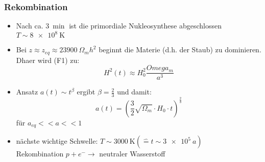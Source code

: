 \subsubsection{Rekombination}
\begin{itemize}
	\item Nach ca. $\SI{3}{\min}$ ist die primordiale Nukleosynthese abgeschlossen $T\sim\SI{8e8}{\K}$
	\item Bei $z\approx z_{eq}\approx\SI{23900}{\Omega_mh^2}$ beginnt die Materie (d.h. der Staub) zu dominieren. Dhaer wird (F1) zu:
		\begin{equation*}
			H^2(t)\approx H_0^2\frac{Omega_m}{a^3}
		\end{equation*}
	\item Ansatz $a(t)\sim t^\beta$ ergibt $\beta=\frac{2}{3}$ und damit:
		\begin{equation*}
			a(t)=\left(\frac{3}{2}\sqrt{\Omega_m}\cdot H_0\cdot t\right)^\frac{2}{3}
		\end{equation*}
		für $a_{eq}<<a<<1$
	\item nächste wichtige Schwelle: $T\sim\SI{3000}{\K} (\hat{=} t\sim\SI{3e5}{a})$\\
		Rekombination $p+e^-\to$ neutraler Wasserstoff
\end{itemize}
